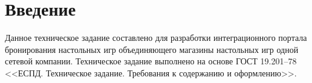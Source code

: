 \section*{Введение}
Данное техническое задание составлено для разработки интеграционного портала бронирования настольных игр объединяющего магазины настольных игр одной сетевой компании. Техническое задание выполнено на основе ГОСТ 19.201–78 <<ЕСПД. Техническое задание. Требования к содержанию и оформлению>>.